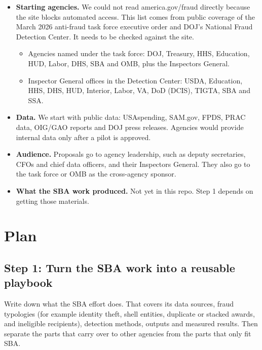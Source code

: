 \documentclass[letterpaper,11pt]{article}
\providecommand{\tightlist}{\setlength{\itemsep}{0pt}\setlength{\parskip}{0pt}}
\begin{document}
\begin{itemize}
\tightlist
\item
  \textbf{Starting agencies.} We could not read america.gov/fraud
  directly because the site blocks automated access. This list comes
  from public coverage of the March 2026 anti-fraud task force executive
  order and DOJ's National Fraud Detection Center. It needs to be
  checked against the site.

  \begin{itemize}
  \tightlist
  \item
    Agencies named under the task force: DOJ, Treasury, HHS, Education,
    HUD, Labor, DHS, SBA and OMB, plus the Inspectors General.
  \item
    Inspector General offices in the Detection Center: USDA, Education,
    HHS, DHS, HUD, Interior, Labor, VA, DoD (DCIS), TIGTA, SBA and SSA.
  \end{itemize}
\item
  \textbf{Data.} We start with public data: USAspending, SAM.gov, FPDS,
  PRAC data, OIG/GAO reports and DOJ press releases. Agencies would
  provide internal data only after a pilot is approved.
\item
  \textbf{Audience.} Proposals go to agency leadership, such as deputy
  secretaries, CFOs and chief data officers, and their Inspectors
  General. They also go to the task force or OMB as the cross-agency
  sponsor.
\item
  \textbf{What the SBA work produced.} Not yet in this repo. Step 1
  depends on getting those materials.
\end{itemize}

\hypertarget{plan}{%
\section{Plan}\label{plan}}

\hypertarget{step-1-turn-the-sba-work-into-a-reusable-playbook}{%
\subsection{Step 1: Turn the SBA work into a reusable
playbook}\label{step-1-turn-the-sba-work-into-a-reusable-playbook}}

Write down what the SBA effort does. That covers its data sources, fraud
typologies (for example identity theft, shell entities, duplicate or
stacked awards, and ineligible recipients), detection methods, outputs
and measured results. Then separate the parts that carry over to other
agencies from the parts that only fit SBA.
\end{document}
